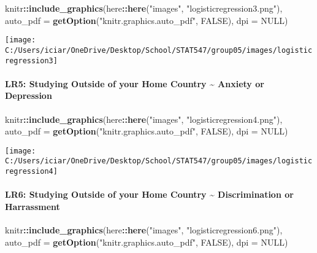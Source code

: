 \documentclass[
]{article}
\newenvironment{Shaded}{\begin{snugshade}}{\end{snugshade}}
\newcommand{\DataTypeTok}[1]{\textcolor[rgb]{0.13,0.29,0.53}{#1}}
\newcommand{\KeywordTok}[1]{\textcolor[rgb]{0.13,0.29,0.53}{\textbf{#1}}}
\newcommand{\NormalTok}[1]{#1}
\newcommand{\OperatorTok}[1]{\textcolor[rgb]{0.81,0.36,0.00}{\textbf{#1}}}
\newcommand{\OtherTok}[1]{\textcolor[rgb]{0.56,0.35,0.01}{#1}}
\newcommand{\StringTok}[1]{\textcolor[rgb]{0.31,0.60,0.02}{#1}}
\begin{document}
\begin{Shaded}
\begin{Highlighting}[]
\NormalTok{knitr}\OperatorTok{::}\KeywordTok{include_graphics}\NormalTok{(here}\OperatorTok{::}\KeywordTok{here}\NormalTok{(}\StringTok{"images"}\NormalTok{, }\StringTok{"logisticregression3.png"}\NormalTok{), }\DataTypeTok{auto_pdf =} \KeywordTok{getOption}\NormalTok{(}\StringTok{"knitr.graphics.auto_pdf"}\NormalTok{, }\OtherTok{FALSE}\NormalTok{), }
    \DataTypeTok{dpi =} \OtherTok{NULL}\NormalTok{)}
\end{Highlighting}
\end{Shaded}

\texttt{[image: C:/Users/iciar/OneDrive/Desktop/School/STAT547/group05/images/logisticregression3]}

\hypertarget{lr5-studying-outside-of-your-home-country-anxiety-or-depression}{%
\paragraph{LR5: Studying Outside of your Home Country \textasciitilde{}
Anxiety or
Depression}\label{lr5-studying-outside-of-your-home-country-anxiety-or-depression}}

\begin{Shaded}
\begin{Highlighting}[]
\NormalTok{knitr}\OperatorTok{::}\KeywordTok{include_graphics}\NormalTok{(here}\OperatorTok{::}\KeywordTok{here}\NormalTok{(}\StringTok{"images"}\NormalTok{, }\StringTok{"logisticregression4.png"}\NormalTok{), }\DataTypeTok{auto_pdf =} \KeywordTok{getOption}\NormalTok{(}\StringTok{"knitr.graphics.auto_pdf"}\NormalTok{, }\OtherTok{FALSE}\NormalTok{), }
    \DataTypeTok{dpi =} \OtherTok{NULL}\NormalTok{)}
\end{Highlighting}
\end{Shaded}

\texttt{[image: C:/Users/iciar/OneDrive/Desktop/School/STAT547/group05/images/logisticregression4]}

\hypertarget{lr6-studying-outside-of-your-home-country-discrimination-or-harrassment}{%
\paragraph{LR6: Studying Outside of your Home Country \textasciitilde{}
Discrimination or
Harrassment}\label{lr6-studying-outside-of-your-home-country-discrimination-or-harrassment}}

\begin{Shaded}
\begin{Highlighting}[]
\NormalTok{knitr}\OperatorTok{::}\KeywordTok{include_graphics}\NormalTok{(here}\OperatorTok{::}\KeywordTok{here}\NormalTok{(}\StringTok{"images"}\NormalTok{, }\StringTok{"logisticregression6.png"}\NormalTok{), }\DataTypeTok{auto_pdf =} \KeywordTok{getOption}\NormalTok{(}\StringTok{"knitr.graphics.auto_pdf"}\NormalTok{, }\OtherTok{FALSE}\NormalTok{), }
    \DataTypeTok{dpi =} \OtherTok{NULL}\NormalTok{)}
\end{Highlighting}
\end{Shaded}
\end{document}

